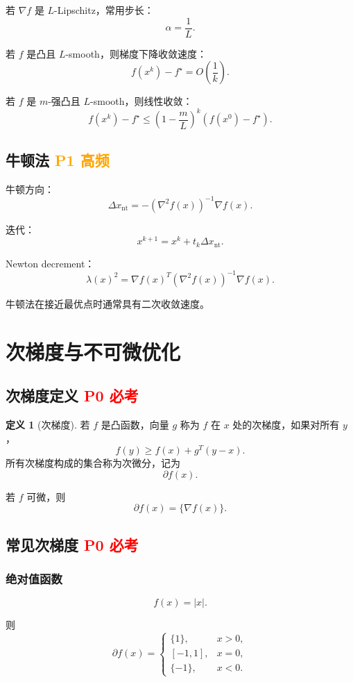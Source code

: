 \documentclass[11pt,a4paper]{ctexart}
\newcommand{\Pzero}{\textcolor{red}{\textbf{P0 必考}}}
\newcommand{\Pone}{\textcolor{orange}{\textbf{P1 高频}}}
\theoremstyle{definition}
\newtheorem{definition}{定义}[section]
\theoremstyle{plain}
\theoremstyle{remark}
\begin{document}
若 $\nabla f$ 是 $L$-Lipschitz，常用步长：
\[
    \alpha = \frac{1}{L}.
\]

若 $f$ 是凸且 $L$-smooth，则梯度下降收敛速度：
\[
    f(x^k)-f^\star = O\left(\frac{1}{k}\right).
\]

若 $f$ 是 $m$-强凸且 $L$-smooth，则线性收敛：
\[
    f(x^k)-f^\star \le
    \left(1-\frac{m}{L}\right)^k
    \left(f(x^0)-f^\star\right).
\]

\subsection{牛顿法 \Pone}

牛顿方向：
\[
    \Delta x_{\mathrm{nt}}
    =
    -\left(\nabla^2 f(x)\right)^{-1}\nabla f(x).
\]

迭代：
\[
    x^{k+1}=x^k+t_k\Delta x_{\mathrm{nt}}.
\]

Newton decrement：
\[
    \lambda(x)^2
    =
    \nabla f(x)^T
    \left(\nabla^2 f(x)\right)^{-1}
    \nabla f(x).
\]

牛顿法在接近最优点时通常具有二次收敛速度。

\section{次梯度与不可微优化}

\subsection{次梯度定义 \Pzero}

\begin{definition}[次梯度]
若 $f$ 是凸函数，向量 $g$ 称为 $f$ 在 $x$ 处的次梯度，如果对所有 $y$，
\[
    f(y)\ge f(x)+g^T(y-x).
\]
所有次梯度构成的集合称为次微分，记为
\[
    \partial f(x).
\]
\end{definition}

若 $f$ 可微，则
\[
    \partial f(x)=\{\nabla f(x)\}.
\]

\subsection{常见次梯度 \Pzero}

\subsubsection*{绝对值函数}

\[
    f(x)=|x|.
\]

则
\[
\partial f(x)=
\begin{cases}
    \{1\}, & x>0,\\
    [-1,1], & x=0,\\
    \{-1\}, & x<0.
\end{cases}
\]
\end{document}
